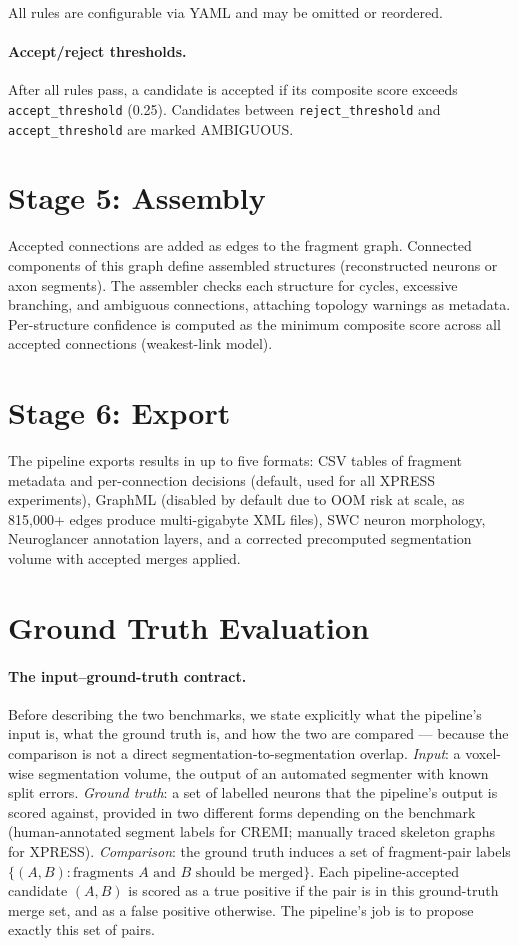 All rules are configurable via YAML and may be omitted or reordered.

\paragraph{Accept/reject thresholds.}
After all rules pass, a candidate is accepted if its composite score exceeds
\texttt{accept\_threshold} (0.25). Candidates between \texttt{reject\_threshold}
and \texttt{accept\_threshold} are marked AMBIGUOUS.

\section{Stage 5: Assembly}

Accepted connections are added as edges to the fragment graph. Connected
components of this graph define assembled structures (reconstructed neurons
or axon segments). The assembler checks each structure for cycles, excessive
branching, and ambiguous connections, attaching topology warnings as metadata.
Per-structure confidence is computed as the minimum composite score across all
accepted connections (weakest-link model).

\section{Stage 6: Export}

The pipeline exports results in up to five formats: CSV tables of fragment
metadata and per-connection decisions (default, used for all XPRESS experiments),
GraphML (disabled by default due to OOM risk at scale, as 815{,}000+ edges produce
multi-gigabyte XML files), SWC neuron morphology, Neuroglancer annotation layers,
and a corrected precomputed segmentation volume with accepted merges applied.

\section{Ground Truth Evaluation}

\paragraph{The input--ground-truth contract.}
Before describing the two benchmarks, we state explicitly what the pipeline's
input is, what the ground truth is, and how the two are compared --- because
the comparison is not a direct segmentation-to-segmentation overlap.
\emph{Input}: a voxel-wise segmentation volume, the output of an automated
segmenter with known split errors.
\emph{Ground truth}: a set of labelled neurons that the pipeline's output is
scored against, provided in two different forms depending on the benchmark
(human-annotated segment labels for CREMI; manually traced skeleton graphs
for XPRESS).
\emph{Comparison}: the ground truth induces a set of fragment-pair labels
$\{(A, B) : \text{fragments } A \text{ and } B \text{ should be merged}\}$.
Each pipeline-accepted candidate $(A, B)$ is scored as a true positive if
the pair is in this ground-truth merge set, and as a false positive otherwise.
The pipeline's job is to propose exactly this set of pairs.


